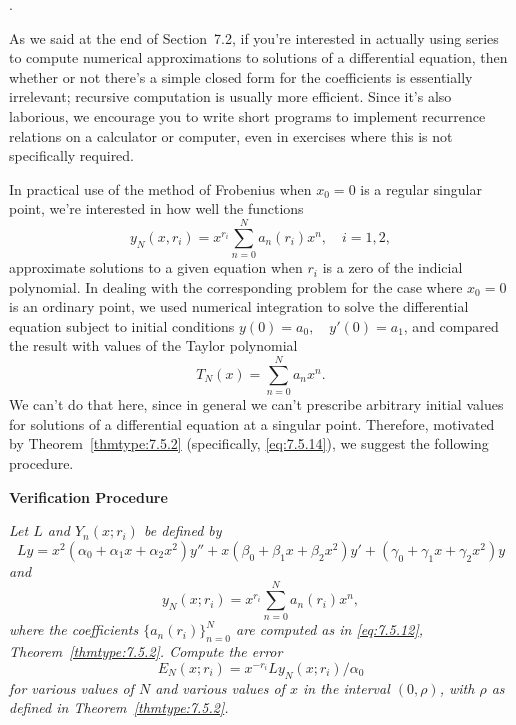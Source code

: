 \color{blue}
.
\color{black}

\technology
\medskip

As we said at the end of Section~7.2, if you're interested in actually using series to compute
numerical approximations to solutions of a differential equation, then whether or not there's a
simple closed form for the coefficients is essentially irrelevant; recursive computation is usually
more efficient. Since it's also laborious, we encourage you to write short programs to implement
recurrence relations on a calculator or computer, even in exercises where this is not specifically
required.

In practical use of the method of Frobenius when $x_{0}=0$ is a regular singular point, we're
interested in how well the functions
\[
  y_{N}(x,r_{i})=x^{r_{i}}\sum_{n=0}^{N}a_{n}(r_{i})x^{n},\quad i=1,2,
\]
approximate solutions to a given equation when $r_{i}$ is a zero of the indicial polynomial. In
dealing with the corresponding problem for the case where $x_{0}=0$ is an ordinary point, we used
numerical integration to solve the differential equation subject to initial conditions
$y(0)=a_{0},\quad y'(0)=a_{1}$, and compared the result with values of the Taylor polynomial
\[
  T_{N}(x)=\sum_{n=0}^{N}a_{n}x^{n}.
\]
We can't do that here, since in general we can't prescribe arbitrary initial values for solutions of
a differential equation at a singular point. Therefore, motivated by Theorem~\ref{thmtype:7.5.2}
(specifically, \eqref{eq:7.5.14}), we suggest the following procedure.

{\color{blue} \centerline{\bf Verification Procedure}

\it Let $L$ and $Y_{n}(x;r_{i})$ be defined by \[Ly=
x^{2}(\alpha_{0}+\alpha_{1}x+\alpha_{2}x^{2})y''+x(\beta_{0}+\beta_{1}x+\beta_{2}x^{2})y'
+(\gamma_{0}+\gamma_{1}x+\gamma_{2}x^{2})y\]
and \[y_{N}(x;r_{i})=x^{r_{i}}\sum_{n=0}^{N}a_{n}(r_{i})x^{n},\] where the coefficients
$\{a_{n}(r_{i})\}_{n=0}^{N}$ are computed as in \eqref{eq:7.5.12}, Theorem~\ref{thmtype:7.5.2}.
Compute the
error \begin{equation}\label{eq:7.5.27}E_{N}(x;r_{i})=x^{-r_{i}}Ly_{N}(x;r_{i})/\alpha_{0}\end{equation}
for various values of $N$ and various values of $x$ in the interval $(0,\rho)$, with $\rho$ as
defined in Theorem~\ref{thmtype:7.5.2}.}

